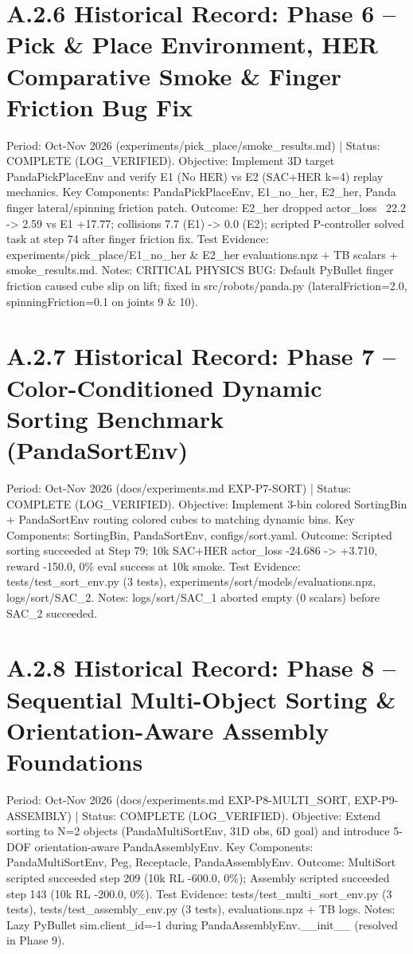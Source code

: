 \documentclass[11pt,a4paper,oneside]{book}
\begin{document}
\section{A.2.6 Historical Record: Phase 6 -- Pick \& Place Environment, HER Comparative Smoke \& Finger Friction Bug Fix}
Period: Oct-Nov 2026 (experiments/pick\_place/smoke\_results.md) | Status: COMPLETE (LOG\_VERIFIED). Objective: Implement 3D target PandaPickPlaceEnv and verify E1 (No HER) vs E2 (SAC+HER k=4) replay mechanics. Key Components: PandaPickPlaceEnv, E1\_no\_her, E2\_her, Panda finger lateral/spinning friction patch. Outcome: E2\_her dropped actor\_loss ~22.2 -> 2.59 vs E1 +17.77; collisions 7.7 (E1) -> 0.0 (E2); scripted P-controller solved task at step 74 after finger friction fix. Test Evidence: experiments/pick\_place/E1\_no\_her \& E2\_her evaluations.npz + TB scalars + smoke\_results.md. Notes: CRITICAL PHYSICS BUG: Default PyBullet finger friction caused cube slip on lift; fixed in src/robots/panda.py (lateralFriction=2.0, spinningFriction=0.1 on joints 9 \& 10).

\section{A.2.7 Historical Record: Phase 7 -- Color-Conditioned Dynamic Sorting Benchmark (PandaSortEnv)}
Period: Oct-Nov 2026 (docs/experiments.md EXP-P7-SORT) | Status: COMPLETE (LOG\_VERIFIED). Objective: Implement 3-bin colored SortingBin + PandaSortEnv routing colored cubes to matching dynamic bins. Key Components: SortingBin, PandaSortEnv, configs/sort.yaml. Outcome: Scripted sorting succeeded at Step 79; 10k SAC+HER actor\_loss -24.686 -> +3.710, reward -150.0, 0\% eval success at 10k smoke. Test Evidence: tests/test\_sort\_env.py (3 tests), experiments/sort/models/evaluations.npz, logs/sort/SAC\_2. Notes: logs/sort/SAC\_1 aborted empty (0 scalars) before SAC\_2 succeeded.

\section{A.2.8 Historical Record: Phase 8 -- Sequential Multi-Object Sorting \& Orientation-Aware Assembly Foundations}
Period: Oct-Nov 2026 (docs/experiments.md EXP-P8-MULTI\_SORT, EXP-P9-ASSEMBLY) | Status: COMPLETE (LOG\_VERIFIED). Objective: Extend sorting to N=2 objects (PandaMultiSortEnv, 31D obs, 6D goal) and introduce 5-DOF orientation-aware PandaAssemblyEnv. Key Components: PandaMultiSortEnv, Peg, Receptacle, PandaAssemblyEnv. Outcome: MultiSort scripted succeeded step 209 (10k RL -600.0, 0\%); Assembly scripted succeeded step 143 (10k RL -200.0, 0\%). Test Evidence: tests/test\_multi\_sort\_env.py (3 tests), tests/test\_assembly\_env.py (3 tests), evaluations.npz + TB logs. Notes: Lazy PyBullet sim.client\_id=-1 during PandaAssemblyEnv.\_\_init\_\_ (resolved in Phase 9).
\end{document}

